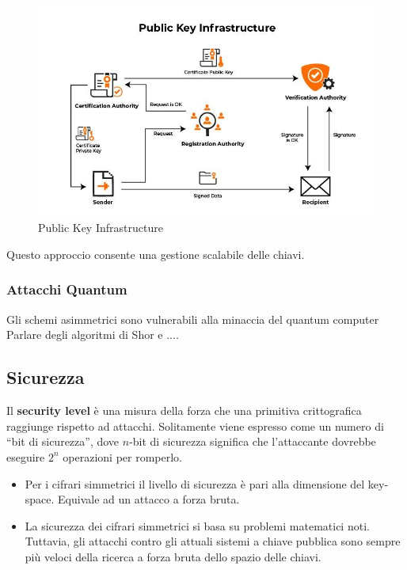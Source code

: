 \begin{figure}[h!]
    \centering
    \includegraphics[scale=0.35]{Figures/pki.jpg}
    \caption{Public Key Infrastructure}
    \label{fig:pki}
\end{figure}

\noindent
Questo approccio consente una gestione scalabile delle chiavi.

\subsubsection*{Attacchi Quantum}

Gli schemi asimmetrici sono vulnerabili alla minaccia del quantum computer
Parlare degli algoritmi di Shor e ....



\subsection{Sicurezza}

Il \textbf{security level} è una misura della forza che una primitiva crittografica raggiunge rispetto ad attacchi.
Solitamente viene espresso come un numero di “bit di sicurezza”, dove $n$-bit di sicurezza significa che l'attaccante dovrebbe eseguire $2^n$ operazioni per romperlo.
\begin{itemize}
    \item Per i cifrari simmetrici il livello di sicurezza è pari alla dimensione del key-space. Equivale ad un attacco a forza bruta.
    \item La sicurezza dei cifrari simmetrici si basa su problemi matematici noti. Tuttavia, gli attacchi contro gli attuali sistemi a chiave pubblica sono sempre più veloci della ricerca a forza bruta dello spazio delle chiavi.
\end{itemize}

